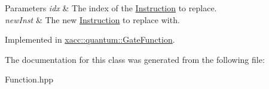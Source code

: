 \begin{DoxyParams}{Parameters}
{\em idx} & The index of the \hyperlink{a00161}{Instruction} to replace. \\
\hline
{\em new\+Inst} & The new \hyperlink{a00161}{Instruction} to replace with. \\
\hline
\end{DoxyParams}


Implemented in \hyperlink{a00111_a182fdfabbf546ae89e4f2384bafb45c9}{xacc\+::quantum\+::\+Gate\+Function}.



The documentation for this class was generated from the following file\+:\begin{DoxyCompactItemize}
\item 
Function.\+hpp\end{DoxyCompactItemize}
